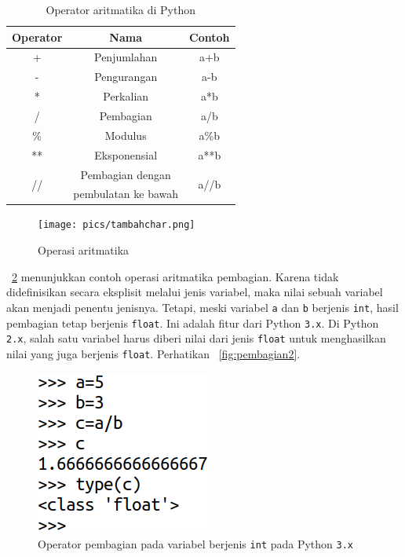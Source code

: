 \begin{table}[h]
\caption{Operator aritmatika di Python}
\label{tab:aritmatika}
  \begin{center}
    \begin{tabular}{@{}ccc@{}}\toprule
    Operator & Nama  & Contoh\\ \midrule
  +  & Penjumlahan & a+b \\ 
  - & Pengurangan & a-b \\
  * & Perkalian & a*b\\
  / & Pembagian & a/b\\
  \% & Modulus & a\%b \\
  ** & Eksponensial & a**b \\
  \multirow{2}{*}{//} & Pembagian dengan & \multirow{2}{*}{a//b} \\
  & pembulatan ke bawah & \\
       \bottomrule
    \end{tabular}
  \end{center}
\end{table}

\begin{figure}
  \begin{center}
    \texttt{[image: pics/tambahchar.png]}
    \caption{Operasi aritmatika}
    \label{fig:aritmatika}
  \end{center}
\end{figure}

\figurename~\ref{fig:pembagian} menunjukkan contoh operasi aritmatika pembagian. Karena tidak didefinisikan secara eksplisit melalui jenis variabel, maka nilai sebuah variabel akan menjadi penentu jenisnya. Tetapi, meski variabel \texttt{a} dan \texttt{b} berjenis \texttt{int}, hasil pembagian tetap berjenis \texttt{float}. Ini adalah fitur dari Python \texttt{3.x}. Di Python \texttt{2.x}, salah satu variabel harus diberi nilai dari jenis \texttt{float} untuk menghasilkan nilai yang juga berjenis \texttt{float}. Perhatikan \figurename~\ref{fig:pembagian2}.

\begin{figure}
  \begin{center}
    \includegraphics[scale=2.0]{pics/pembagian.png}
    \caption{Operator pembagian pada variabel berjenis \texttt{int} pada Python \texttt{3.x}}
    \label{fig:pembagian}
  \end{center}
\end{figure}


